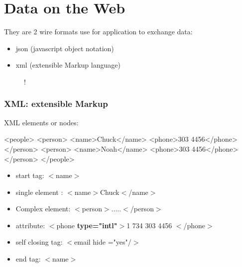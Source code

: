 \documentclass[a4paper,12pt]{report}
\begin{document}
\part{Data on the Web}
They are 2 wire formats use for application to exchange data: 
\begin{itemize}
\item json (javascript object notation)
\item xml (extensible Markup  language)
\end{itemize}
\begin{figure}[H]
        \centering
        \resizebox {6in} {!} {
}
\end{figure}

\section{XML: extensible Markup }
XML elements or nodes:
\begin{tcolorbox}
\begin{python}
<people>
	<person>
		<name>Chuck</name>
		<phone>303 4456</phone>
	</person>
	<person>
		<name>Noah</name>
		<phone>303 4456</phone>
	</person>
</people>
\end{python}
\end{tcolorbox}

\begin{itemize}
\item start tag: $<$name$>$
\item single element : $<$name$>$Chuck$<$/name$>$
\item Complex element: $<$person$>$.....$<$/person$>$
\item attribute: $<$phone \textbf{type="intl"}$>$1 734 303 4456 $<$/phone$>$
\item self closing tag: $<$email hide ="yes"/$>$
\item end tag: $<$name$>$
\end{itemize}
\end{document}
